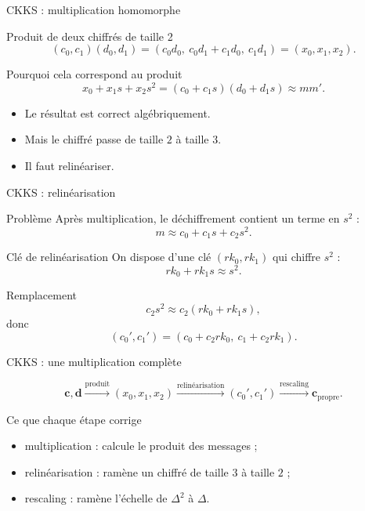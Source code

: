 \documentclass[10pt,aspectratio=169]{beamer}
\begin{document}
\begin{frame}{CKKS : multiplication homomorphe}
  \small
  \begin{block}{Produit de deux chiffrés de taille 2}
    \[
      (c_0,c_1)(d_0,d_1)
      =
      (c_0d_0,\ c_0d_1+c_1d_0,\ c_1d_1)
      =
      (x_0,x_1,x_2).
    \]
  \end{block}

  \begin{block}{Pourquoi cela correspond au produit}
    \[
      x_0+x_1s+x_2s^2
      =
      (c_0+c_1s)(d_0+d_1s)
      \approx mm'.
    \]
  \end{block}

  \begin{itemize}
    \item Le résultat est correct algébriquement.
    \item Mais le chiffré passe de taille $2$ à taille $3$.
    \item Il faut relinéariser.
  \end{itemize}
\end{frame}

\begin{frame}{CKKS : relinéarisation}
  \small
  \begin{block}{Problème}
    Après multiplication, le déchiffrement contient un terme en $s^2$ :
    \[
      m\approx c_0+c_1s+c_2s^2.
    \]
  \end{block}

  \begin{block}{Clé de relinéarisation}
    On dispose d'une clé $(rk_0,rk_1)$ qui chiffre $s^2$ :
    \[
      rk_0+rk_1s\approx s^2.
    \]
  \end{block}

  \begin{exampleblock}{Remplacement}
    \[
      c_2s^2\approx c_2(rk_0+rk_1s),
    \]
    donc
    \[
      (c_0',c_1')=(c_0+c_2rk_0,\ c_1+c_2rk_1).
    \]
  \end{exampleblock}
\end{frame}

\begin{frame}{CKKS : une multiplication complète}
  \begin{center}
    \[
      \mathbf c,\mathbf d
      \xrightarrow{\text{produit}}
      (x_0,x_1,x_2)
      \xrightarrow{\text{relinéarisation}}
      (c_0',c_1')
      \xrightarrow{\text{rescaling}}
      \mathbf c_{\mathrm{propre}}.
    \]
  \end{center}

  \begin{block}{Ce que chaque étape corrige}
    \begin{itemize}
      \item multiplication : calcule le produit des messages ;
      \item relinéarisation : ramène un chiffré de taille $3$ à taille $2$ ;
      \item rescaling : ramène l'échelle de $\Delta^2$ à $\Delta$.
    \end{itemize}
  \end{block}
\end{frame}
\end{document}
